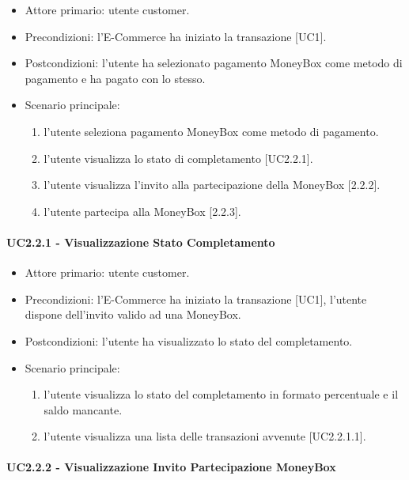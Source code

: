 \begin{itemize}
    \item Attore primario: utente customer.
    \item Precondizioni: l'E-Commerce ha iniziato la transazione [UC1].
    \item Postcondizioni: l'utente ha selezionato pagamento MoneyBox come metodo di pagamento e ha pagato con lo stesso.
    \item Scenario principale:\begin{enumerate}
        \item l'utente seleziona pagamento MoneyBox come metodo di pagamento.
        \item l'utente visualizza lo stato di completamento [UC2.2.1].
        \item l'utente visualizza l'invito alla partecipazione della MoneyBox [2.2.2].
        \item l'utente partecipa alla MoneyBox [2.2.3].
    \end{enumerate}
\end{itemize}

\paragraph{UC2.2.1 - Visualizzazione Stato Completamento}

\begin{itemize}
    \item Attore primario: utente customer.
    \item Precondizioni: l'E-Commerce ha iniziato la transazione [UC1], l'utente dispone dell'invito valido ad una MoneyBox.
    \item Postcondizioni: l'utente ha visualizzato lo stato del completamento.
    \item Scenario principale: \begin{enumerate}
        \item l'utente visualizza lo stato del completamento in formato percentuale e il saldo mancante.
        \item l'utente visualizza una lista delle transazioni avvenute [UC2.2.1.1].
    \end{enumerate}
    \end{itemize}

\paragraph{UC2.2.2 - Visualizzazione Invito Partecipazione MoneyBox}

